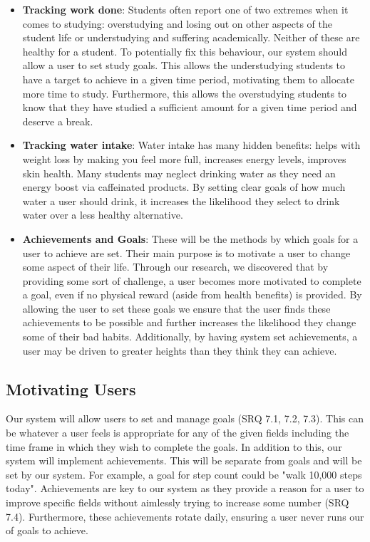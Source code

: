 \documentclass[11pt]{article}
\begin{document}
\begin{itemize}
    \item \textbf{Tracking work done}: Students often report one of two
        extremes when it comes to studying: overstudying and losing out on
        other aspects of the student life or understudying and suffering
        academically. Neither of these are healthy for a student. To
        potentially fix this behaviour, our system should allow a user to set
        study goals. This allows the understudying students to have a target to
        achieve in a given time period, motivating them to allocate more time
        to study. Furthermore, this allows the overstudying students to know
        that they have studied a sufficient amount for a given time period and
        deserve a break.
    
    \item \textbf{Tracking water intake}: Water intake has many hidden
        benefits: helps with weight loss by making you feel more full,
        increases energy levels, improves skin health. Many students may
        neglect drinking water as they need an energy boost via caffeinated
        products. By setting clear goals of how much water a user should drink,
        it increases the likelihood they select to drink water over a less
        healthy alternative.

    \item \textbf{Achievements and Goals}: These will be the methods by which goals for a
        user to achieve are set. Their main purpose is to motivate a user to
        change some aspect of their life. Through our research, we discovered
        that by providing some sort of challenge, a user becomes more motivated
        to complete a goal, even if no physical reward (aside from health
        benefits) is provided. By allowing the user to set these goals we
        ensure that the user finds these achievements to be possible and
        further increases the likelihood they change some of their bad habits.
        Additionally, by having system set achievements, a user may be driven to
        greater heights than they think they can achieve.

\end{itemize}


\subsection{Motivating Users}

Our system will allow users to set and manage goals (SRQ 7.1, 7.2, 7.3). This can be whatever a user feels is appropriate for any of the given 
fields including the time frame in which they wish to complete the goals. In addition to this, our system will implement achievements.
This will be separate from goals and will be set by our system. For example, a goal for step count could be "walk 10,000 steps today".
Achievements are key to our system as they provide a reason for a user to improve specific fields
without aimlessly trying to increase some number (SRQ 7.4). Furthermore, these
achievements rotate daily, ensuring a user never runs our of goals to achieve.\\
\end{document}
